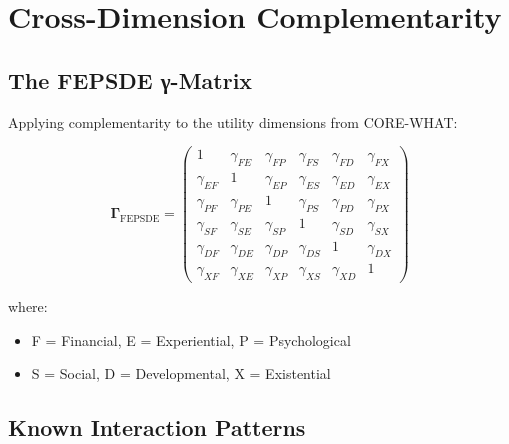 \section{Cross-Dimension Complementarity}
\label{sec:how-dimension}

\subsection{The FEPSDE γ-Matrix}

Applying complementarity to the utility dimensions from CORE-WHAT:

\begin{equation}
\mathbf{\Gamma}_{\text{FEPSDE}} = \begin{pmatrix}
1 & \gamma_{FE} & \gamma_{FP} & \gamma_{FS} & \gamma_{FD} & \gamma_{FX} \\
\gamma_{EF} & 1 & \gamma_{EP} & \gamma_{ES} & \gamma_{ED} & \gamma_{EX} \\
\gamma_{PF} & \gamma_{PE} & 1 & \gamma_{PS} & \gamma_{PD} & \gamma_{PX} \\
\gamma_{SF} & \gamma_{SE} & \gamma_{SP} & 1 & \gamma_{SD} & \gamma_{SX} \\
\gamma_{DF} & \gamma_{DE} & \gamma_{DP} & \gamma_{DS} & 1 & \gamma_{DX} \\
\gamma_{XF} & \gamma_{XE} & \gamma_{XP} & \gamma_{XS} & \gamma_{XD} & 1
\end{pmatrix}
\end{equation}

where:
\begin{itemize}[nosep]
\item F = Financial, E = Experiential, P = Psychological
\item S = Social, D = Developmental, X = Existential
\end{itemize}

\subsection{Known Interaction Patterns}

